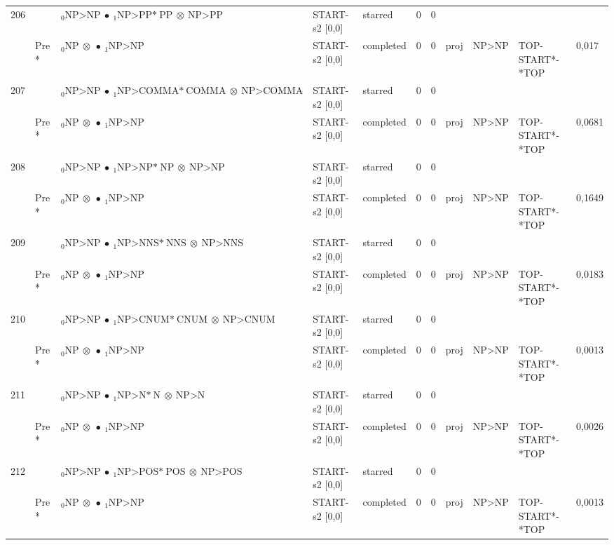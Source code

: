 \documentclass[10pt]{article}
\begin{document}
\begin{longtable}[htbp]{lllllllllll}
206 & & $ {}_0 \textrm{NP>NP} \  \bullet \ {}_{1} \textrm{NP>PP*} \ \textrm{PP} \  \otimes \ \textrm{NP>PP} $ & START-s2 [0,0] & starred & 0 & 0 & & & & \\ 
 & Pre *& $ {}_0 \textrm{NP} \  \otimes \  \bullet \ {}_{1} \textrm{NP>NP} $ & START-s2 [0,0] & completed & 0 & 0 & proj & NP>NP & TOP-START*-*TOP & 0,017 \\ 
207 & & $ {}_0 \textrm{NP>NP} \  \bullet \ {}_{1} \textrm{NP>COMMA*} \ \textrm{COMMA} \  \otimes \ \textrm{NP>COMMA} $ & START-s2 [0,0] & starred & 0 & 0 & & & & \\ 
 & Pre *& $ {}_0 \textrm{NP} \  \otimes \  \bullet \ {}_{1} \textrm{NP>NP} $ & START-s2 [0,0] & completed & 0 & 0 & proj & NP>NP & TOP-START*-*TOP & 0,0681 \\ 
208 & & $ {}_0 \textrm{NP>NP} \  \bullet \ {}_{1} \textrm{NP>NP*} \ \textrm{NP} \  \otimes \ \textrm{NP>NP} $ & START-s2 [0,0] & starred & 0 & 0 & & & & \\ 
 & Pre *& $ {}_0 \textrm{NP} \  \otimes \  \bullet \ {}_{1} \textrm{NP>NP} $ & START-s2 [0,0] & completed & 0 & 0 & proj & NP>NP & TOP-START*-*TOP & 0,1649 \\ 
209 & & $ {}_0 \textrm{NP>NP} \  \bullet \ {}_{1} \textrm{NP>NNS*} \ \textrm{NNS} \  \otimes \ \textrm{NP>NNS} $ & START-s2 [0,0] & starred & 0 & 0 & & & & \\ 
 & Pre *& $ {}_0 \textrm{NP} \  \otimes \  \bullet \ {}_{1} \textrm{NP>NP} $ & START-s2 [0,0] & completed & 0 & 0 & proj & NP>NP & TOP-START*-*TOP & 0,0183 \\ 
210 & & $ {}_0 \textrm{NP>NP} \  \bullet \ {}_{1} \textrm{NP>CNUM*} \ \textrm{CNUM} \  \otimes \ \textrm{NP>CNUM} $ & START-s2 [0,0] & starred & 0 & 0 & & & & \\ 
 & Pre *& $ {}_0 \textrm{NP} \  \otimes \  \bullet \ {}_{1} \textrm{NP>NP} $ & START-s2 [0,0] & completed & 0 & 0 & proj & NP>NP & TOP-START*-*TOP & 0,0013 \\ 
211 & & $ {}_0 \textrm{NP>NP} \  \bullet \ {}_{1} \textrm{NP>N*} \ \textrm{N} \  \otimes \ \textrm{NP>N} $ & START-s2 [0,0] & starred & 0 & 0 & & & & \\ 
 & Pre *& $ {}_0 \textrm{NP} \  \otimes \  \bullet \ {}_{1} \textrm{NP>NP} $ & START-s2 [0,0] & completed & 0 & 0 & proj & NP>NP & TOP-START*-*TOP & 0,0026 \\ 
212 & & $ {}_0 \textrm{NP>NP} \  \bullet \ {}_{1} \textrm{NP>POS*} \ \textrm{POS} \  \otimes \ \textrm{NP>POS} $ & START-s2 [0,0] & starred & 0 & 0 & & & & \\ 
 & Pre *& $ {}_0 \textrm{NP} \  \otimes \  \bullet \ {}_{1} \textrm{NP>NP} $ & START-s2 [0,0] & completed & 0 & 0 & proj & NP>NP & TOP-START*-*TOP & 0,0013 \\ 

\end{longtable}
\end{document}
